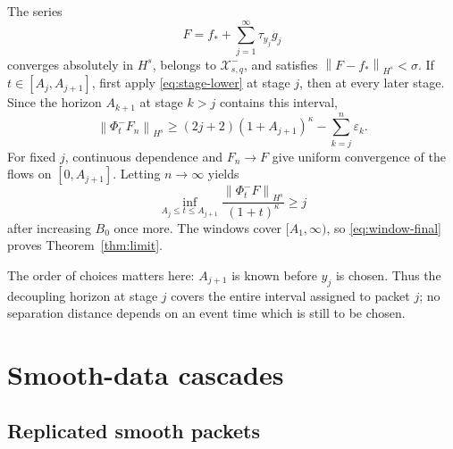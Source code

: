 \documentclass[11pt,reqno]{amsart}
\numberwithin{equation}{section}
\theoremstyle{remark}
\newcommand{\X}{\mathcal X}
\newcommand{\eps}{\varepsilon}
\newcommand{\norm}[1]{\left\lVert #1\right\rVert}
\newcommand{\flow}[1]{\Phi^{#1}}
\newcommand{\trans}[1]{\tau_{#1}}
\begin{document}
The series
\begin{equation}\label{eq:F-limit}
 F=f_*+\sum_{j=1}^\infty\trans{y_j}g_j
\end{equation}
converges absolutely in $H^s$, belongs to $\X^-_{s,q}$, and satisfies
$\norm{F-f_*}_{H^s}<\sigma$.  If $t\in[A_j,A_{j+1}]$, first apply
\eqref{eq:stage-lower} at stage $j$, then at every later stage.  Since the
horizon $A_{k+1}$ at stage $k>j$ contains this interval,
\[
 \norm{\flow-_tF_n}_{H^s}
 \geq(2j+2)(1+A_{j+1})^\kappa-
 \sum_{k=j}^n\eps_k.
\]
For fixed $j$, continuous dependence and $F_n\to F$ give uniform convergence
of the flows on $[0,A_{j+1}]$.  Letting $n\to\infty$ yields
\begin{equation}\label{eq:window-final}
 \inf_{A_j\leq t\leq A_{j+1}}
 \frac{\norm{\flow-_tF}_{H^s}}{(1+t)^\kappa}
 \geq j
\end{equation}
after increasing $B_0$ once more.  The windows cover $[A_1,\infty)$, so
\eqref{eq:window-final} proves Theorem~\ref{thm:limit}.

The order of choices matters here: $A_{j+1}$ is known before $y_j$ is chosen.
Thus the decoupling horizon at stage $j$ covers the entire interval assigned
to packet $j$; no separation distance depends on an event time which is still
to be chosen.

\section{Smooth-data cascades}\label{sec:smooth-data}

\subsection{Replicated smooth packets}
\end{document}
